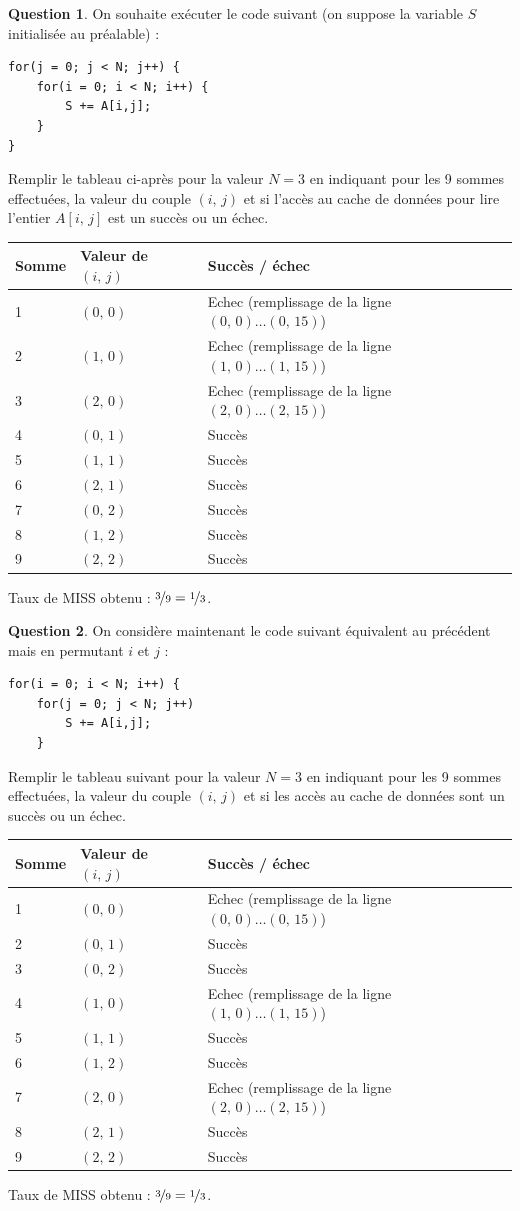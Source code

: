 \documentclass[11pt,english,french]{scrreprt}
\theoremstyle{remark}
\theoremstyle{definition}
\newtheorem{ques}{Question}[section]
\begin{document}
\begin{ques}

	On souhaite exécuter le code suivant (on suppose la variable $S$ initialisée au préalable) : 
\begin{lstlisting}
for(j = 0; j < N; j++) {
	for(i = 0; i < N; i++) {
		S += A[i,j];
	}
}
\end{lstlisting}

	Remplir le tableau ci-après pour la valeur $N=3$ en indiquant pour les 9 sommes effectuées, la valeur du couple $(i,\,j)$ et si l'accès au cache de données pour lire l'entier $A[i,\,j]$ est un succès ou un échec.

	\begin{tabularx}{\textwidth}{llX}
		\toprule
		Somme & Valeur de $(i,\,j)$ & Succès / échec\tabularnewline
		\midrule
		\midrule
		1 & $(0,\,0)$ & Echec (remplissage de la ligne $(0,\,0)\dots (0,\,15)$)\tabularnewline
		\midrule
		2 & $(1,\,0)$ & Echec (remplissage de la ligne $(1,\,0)\dots (1,\,15)$)\tabularnewline
		\midrule
		3 & $(2,\,0)$ & Echec (remplissage de la ligne $(2,\,0)\dots (2,\,15)$)\tabularnewline
		\midrule
		4 & $(0,\,1)$ & Succès\tabularnewline
		\midrule
		5 & $(1,\,1)$ & Succès\tabularnewline
		\midrule
		6 & $(2,\,1)$ & Succès\tabularnewline
		\midrule
		7 & $(0,\,2)$ & Succès\tabularnewline
		\midrule
		8 & $(1,\,2)$ & Succès\tabularnewline
		\midrule
		9 & $(2,\,2)$ & Succès\tabularnewline
		\bottomrule
	\end{tabularx}

	Taux de MISS obtenu : $\nicefrac{3}{9} = \nicefrac{1}{3}$.
\end{ques}

\begin{ques}
	On considère maintenant le code suivant équivalent au précédent mais en permutant $i$ et $j$ : 
\begin{lstlisting}
for(i = 0; i < N; i++) {
	for(j = 0; j < N; j++)
		S += A[i,j];
	}
\end{lstlisting}
	
	Remplir le tableau suivant pour la valeur $N=3$ en indiquant pour les 9 sommes effectuées, la valeur du couple $(i,\,j)$ et si les accès au cache de données sont un succès ou un échec.
	
	\begin{tabularx}{\textwidth}{llX}
		\toprule
		Somme & Valeur de $(i,\,j)$ & Succès / échec\tabularnewline
		\midrule
		\midrule
		1 & $(0,\,0)$ & Echec (remplissage de la ligne $(0,\,0)\dots (0,\,15)$)\tabularnewline
		\midrule
		2 & $(0,\,1)$ & Succès\tabularnewline
		\midrule
		3 & $(0,\,2)$ & Succès\tabularnewline
		\midrule
		4 & $(1,\,0)$ & Echec (remplissage de la ligne $(1,\,0)\dots (1,\,15)$)\tabularnewline
		\midrule
		5 & $(1,\,1)$ & Succès\tabularnewline
		\midrule
		6 & $(1,\,2)$ & Succès\tabularnewline
		\midrule
		7 & $(2,\,0)$ & Echec (remplissage de la ligne $(2,\,0)\dots (2,\,15)$)\tabularnewline
		\midrule
		8 & $(2,\,1)$ & Succès\tabularnewline
		\midrule
		9 & $(2,\,2)$ & Succès\tabularnewline
		\bottomrule
	\end{tabularx}

	Taux de MISS obtenu : $\nicefrac{3}{9} = \nicefrac{1}{3}$.
\end{ques}
\end{document}
